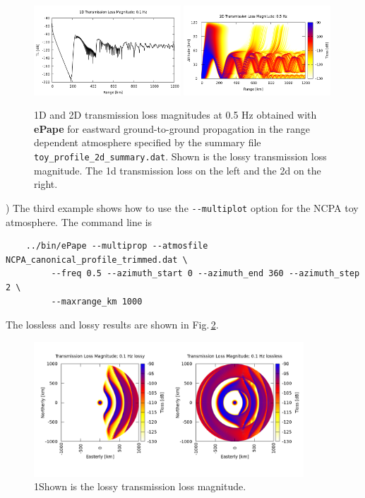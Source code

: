 \begin{figure}[h]
\begin{center}
\includegraphics[width=0.49\textwidth]{figs/ePape_ex2_1d}
\includegraphics[width=0.49\textwidth]{figs/ePape_ex2_2d}
\end{center}
\caption{1D and 2D transmission loss magnitudes at 0.5 Hz obtained with {\bf ePape} for eastward ground-to-ground propagation in the range dependent atmosphere specified by the summary file {\tt toy\_profile\_2d\_summary.dat}. Shown is the lossy transmission loss magnitude. The 1d transmission loss on the left and the 2d on the right.}
\label{fig: ePape ex2}
\end{figure}

) The third example shows how to use the \verb+--multiplot+ option for the NCPA toy atmosphere. The command line is
\begin{verbatim}
    ../bin/ePape --multiprop --atmosfile NCPA_canonical_profile_trimmed.dat \
         --freq 0.5 --azimuth_start 0 --azimuth_end 360 --azimuth_step 2 \
         --maxrange_km 1000
\end{verbatim}
The lossless and lossy results are shown in Fig.\,\ref{fig: ePape ex3}. 
         
\begin{figure}[h]
\begin{center}
\includegraphics[width=0.9\textwidth]{figs/ePape_ex3}
\end{center}
\caption{1Shown is the lossy transmission loss magnitude.}
\label{fig: ePape ex3}
\end{figure}



